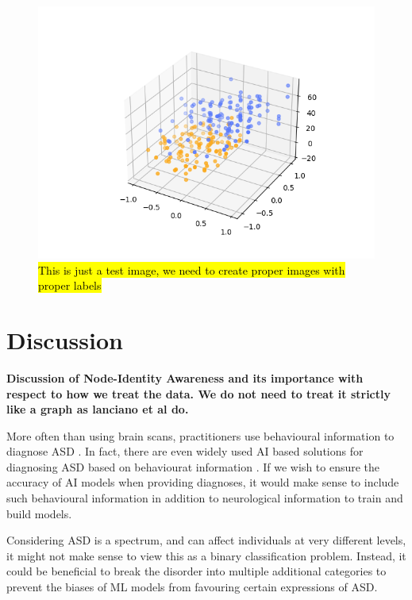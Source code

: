 \documentclass[sigconf]{acmart}
\begin{document}
\begin{figure}
    \centering
    \includegraphics[width=\columnwidth, keepaspectratio=true]{test.png}
    \caption{\hl{This is just a test image, we need to create proper images with proper labels}}
    \label{fig:my_label}
\end{figure}


\section{Discussion}\label{discussion}
\textbf{Discussion of Node-Identity Awareness and its importance with respect to how we treat the data. We do not need to treat it strictly like a graph as lanciano et al do.}

More often than using brain scans, practitioners use behavioural information to diagnose ASD \cite{lord2006, johnson2007, dsm52013}.
In fact, there are even widely used AI based solutions for diagnosing ASD based on behaviourat information \cite{knopf2021}.
If we wish to ensure the accuracy of AI models when providing diagnoses, it would make sense to include such behavioural information in addition to neurological information to train and build models.

Considering ASD is a spectrum, and can affect individuals at very different levels, it might not make sense to view this as a binary classification problem.
Instead, it could be beneficial to break the disorder into multiple additional categories to prevent the biases of ML models from favouring certain expressions of ASD.
\end{document}

